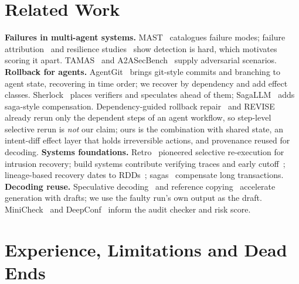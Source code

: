 \documentclass[10pt,twocolumn,letterpaper]{article}
\begin{document}
\section{Related Work}
\label{sec:related}

\textbf{Failures in multi-agent systems.} MAST~\cite{cemri2025why} catalogues
failure modes; failure attribution~\cite{zhang2025which} and resilience
studies~\cite{huang2025resilience} show detection is hard, which motivates scoring it
apart. TAMAS~\cite{kavathekar2025tamas} and A2ASecBench~\cite{li2026a2asecbench}
supply adversarial scenarios.
\textbf{Rollback for agents.} AgentGit~\cite{li2025agentgit} brings git-style
commits and branching to agent state, recovering in time order; we recover by
dependency and add effect classes. Sherlock~\cite{ro2025sherlock} places verifiers
and speculates ahead of them; SagaLLM~\cite{chang2025sagallm} adds saga-style
compensation. Dependency-guided rollback repair~\cite{wang2026rollback} and
REVISE~\cite{revise2026} already rerun only the dependent steps of an agent
workflow, so step-level selective rerun is \emph{not} our claim; ours is the
combination with shared state, an intent-diff effect layer that holds irreversible
actions, and provenance reused for decoding.
\textbf{Systems foundations.} Retro~\cite{kim2010retro} pioneered selective
re-execution for intrusion recovery; build systems contribute verifying traces and
early cutoff~\cite{mokhov2018build,mitchell2012shake}; lineage-based recovery dates
to RDDs~\cite{zaharia2012rdd}; sagas~\cite{garcia1987sagas} compensate long
transactions. \textbf{Decoding reuse.} Speculative
decoding~\cite{leviathan2023fast} and reference copying~\cite{yang2023llma}
accelerate generation with drafts; we use the faulty run's own output as the draft.
MiniCheck~\cite{tang2024minicheck} and DeepConf~\cite{fu2025deepconf} inform the
audit checker and risk score.

\section{Experience, Limitations and Dead Ends}
\label{sec:experience}
\end{document}
